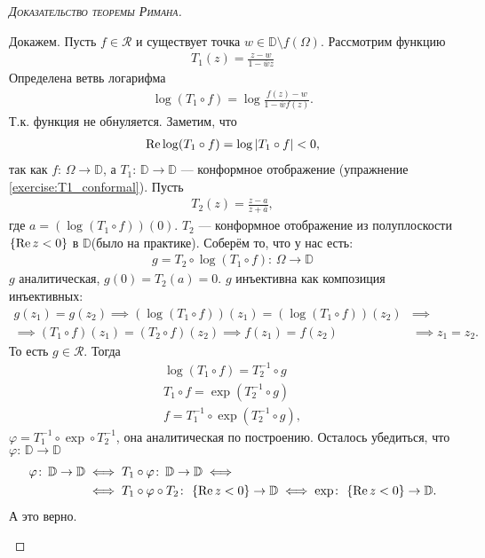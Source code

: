 \documentclass[../complex-analysis.tex]{subfiles}
\begin{document}
\begin{proof}[\normalfont\textsc{Доказательство теоремы Римана}]
\begin{enumerate}
   Докажем. Пусть $ f \in \mathcal R $ и существует точка $ w \in \mathbb D \setminus f(\Omega) $. Рассмотрим функцию
   \begin{align*}
    T_1(z) = \frac{z-w}{1 - \overline w z}
   \end{align*} Определена ветвь логарифма
   \begin{align*}
    \log (T_1 \circ f) = \log \frac{f(z) - w}{1 - \overline w f(z)}.
   \end{align*} Т.к. функция не обнуляется. Заметим, что
   \begin{align*}
    \operatorname{Re} \log (T_1 \circ f) = \log \left| T_1 \circ f \right| < 0,
\end{align*} так как $ f \colon\,\Omega \to \mathbb D $, а $ T_1 \colon\,\mathbb D \to \mathbb D $ --- конформное отображение (упражнение \eqref{exercise:T1_conformal}). Пусть
   \begin{align*}
    T_2(z) = \frac{z-a}{z+\overline a},
   \end{align*} где $ a = (\log (T_1 \circ f))(0) $. $ T_2 $ --- конформное отображение из полуплоскости $ \left\{ \operatorname{Re} z < 0 \right\} $ в $ \mathbb D $(было на практике). Соберём то, что у нас есть:
   \begin{align*}
    g = T_2 \circ \log (T_1 \circ f)\colon\,\Omega \to \mathbb D
   \end{align*} $ g $ аналитическая, $ g(0) = T_2(a) = 0 $. $ g $ инъективна как композиция инъективных:
   \begin{align*}
	   g(z_1) = g(z_2) \implies (\log(T_1 \circ f))(z_1) = (\log(T_1 \circ f))(z_2) &\implies \\
	   \implies (T_1 \circ f) (z_1) = (T_2 \circ f)(z_2) \implies f(z_1) = f(z_2) &\implies z_1 = z_2.
   \end{align*} То есть $ g \in \mathcal R $. Тогда
   \begin{align*}
    \log(T_1 \circ f) = T_2^{-1} \circ g \\
    T_1 \circ f = \exp (T_2^{-1} \circ g) \\
    f = T_1^{-1} \circ \exp (T_2^{-1} \circ g),
   \end{align*} 
   $ \varphi = T_1^{-1} \circ \exp \circ T_2^{-1} $, она аналитическая по построению.
   Осталось убедиться, что $ \varphi \colon\,\mathbb D \to \mathbb D$ 
   \begin{align*}
	\varphi \colon\,\mathbb D \to \mathbb D &\iff T_1 \circ \varphi \colon\,\mathbb D \to \mathbb D \iff \\
	&\iff T_1 \circ \varphi \circ T_2 \colon\,\left\{ \operatorname{Re} z < 0 \right\} \to \mathbb D \iff \exp \colon\,\left\{ \operatorname{Re} z < 0 \right\} \to \mathbb D.
   \end{align*} А это верно.


\end{enumerate}
\end{proof}
\end{document}
